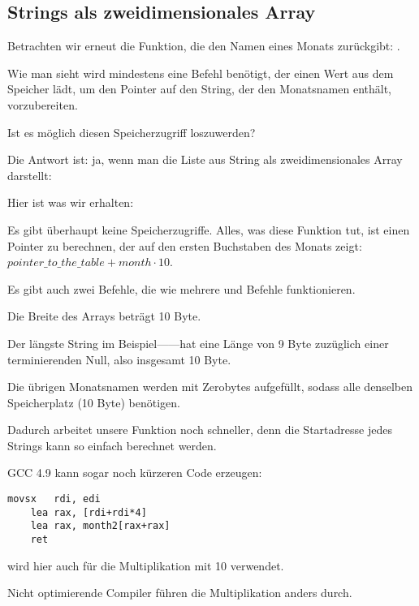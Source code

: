 \subsection{Strings als zweidimensionales Array}
Betrachten wir erneut die Funktion, die den Namen eines Monats zurückgibt: .

Wie man sieht wird mindestens eine Befehl benötigt, der einen Wert aus dem Speicher lädt, um den Pointer auf den String,
der den Monatsnamen enthält, vorzubereiten.

Ist es möglich diesen Speicherzugriff loszuwerden?

Die Antwort ist: ja, wenn man die Liste aus String als zweidimensionales Array darstellt:



Hier ist was wir erhalten:



Es gibt überhaupt keine Speicherzugriffe.
Alles, was diese Funktion tut, ist einen Pointer zu berechnen, der auf den ersten Buchstaben des Monats
zeigt:$pointer\_to\_the\_table + month \cdot 10$.

Es gibt auch zwei \LEA Befehle, die wie mehrere \MUL und \MOV Befehle funktionieren.

Die Breite des Arrays beträgt 10 Byte.

Der längste String im Beispiel------hat eine Länge von 9 Byte zuzüglich einer terminierenden Null, also
insgesamt 10 Byte.

Die übrigen Monatsnamen werden mit Zerobytes aufgefüllt, sodass alle denselben Speicherplatz (10 Byte) benötigen.

Dadurch arbeitet unsere Funktion noch schneller, denn die Startadresse jedes Strings kann so einfach berechnet werden.

\Optimizing GCC 4.9 kann sogar noch kürzeren Code erzeugen:

\begin{lstlisting}[caption=\Optimizing GCC 4.9 x64,style=customasmx86]
	movsx	rdi, edi
	lea	rax, [rdi+rdi*4]
	lea	rax, month2[rax+rax]
	ret
\end{lstlisting}

\LEA wird hier auch für die Multiplikation mit 10 verwendet.

Nicht optimierende Compiler führen die Multiplikation anders durch.

